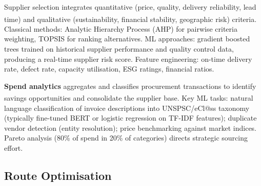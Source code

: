 \begin{tcbitemize}[ skin=sectionraster ]

    \tcbitem[title=Multi-Criteria Supplier Scoring, raster multicolumn=3]
    Supplier selection integrates quantitative (price, quality, delivery reliability, lead time) and qualitative (sustainability, financial stability, geographic risk) criteria\textsuperscript{\cite[][pp.~308--314]{chopraSupplyChainManagement2019}}.
    Classical methods: Analytic Hierarchy Process (AHP) for pairwise criteria weighting, TOPSIS for ranking alternatives.
    ML approaches: gradient boosted trees trained on historical supplier performance and quality control data, producing a real-time supplier risk score.
    Feature engineering: on-time delivery rate, defect rate, capacity utilisation, ESG ratings, financial ratios.

    \tcbitem[title=Spend Analytics, raster multicolumn=3]
    \textbf{Spend analytics} aggregates and classifies procurement transactions to identify savings opportunities and consolidate the supplier base\textsuperscript{\cite[][pp.~316--320]{chopraSupplyChainManagement2019}}.
    Key ML tasks: natural language classification of invoice descriptions into UNSPSC/eCl@ss taxonomy (typically fine-tuned BERT or logistic regression on TF-IDF features); duplicate vendor detection (entity resolution); price benchmarking against market indices.
    Pareto analysis (80\% of spend in 20\% of categories) directs strategic sourcing effort.

\end{tcbitemize}

\subsection{Route Optimisation}

